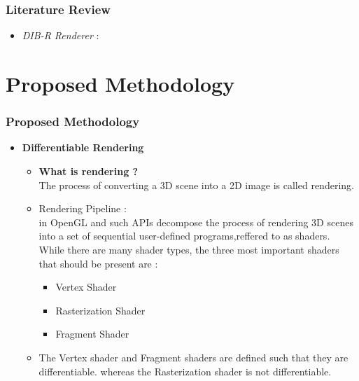 \documentclass{beamer}
\begin{document}
	\begin{frame}
	\frametitle{Literature Review}
	\begin{itemize}
	
	\item \textit{DIB-R Renderer} :
	
	
	
	\end{itemize}
	\end{frame}
	
	
	
	\section{Proposed Methodology}
	\begin{frame}
	\frametitle{Proposed Methodology}
	\begin{itemize}
		\item \textbf{Differentiable Rendering} \\ 
		\begin{itemize}
			\item \textbf{What is rendering ?} \\
			The process of converting a 3D scene into a 2D image is called rendering.
			\item Rendering Pipeline :\\
			in OpenGL and such APIs decompose the process of rendering 3D scenes into a set of sequential user-defined programs,reffered to as shaders. While there are many shader types, the three most important shaders that should be present are :
			\begin{itemize}
				\item Vertex Shader
				\item Rasterization Shader
				\item Fragment Shader

			\end{itemize}
		\item The Vertex shader and Fragment shaders are defined such that they are differentiable. whereas the Rasterization shader is not differentiable.
			
		\end{itemize}
	\end{itemize}
	\end{frame}	
\end{document}
